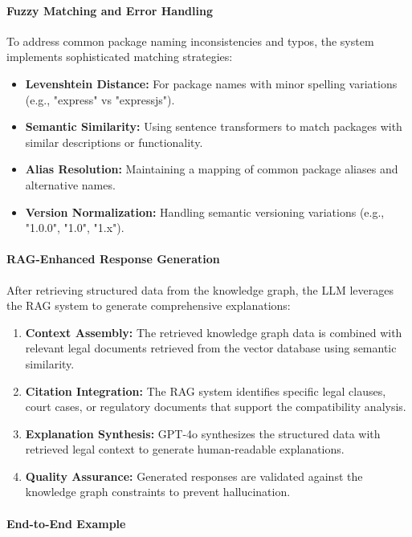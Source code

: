 \paragraph{Fuzzy Matching and Error Handling}
To address common package naming inconsistencies and typos, the system implements sophisticated matching strategies:

\begin{itemize}
    \item \textbf{Levenshtein Distance:} For package names with minor spelling variations (e.g., "express" vs "expressjs").
    \item \textbf{Semantic Similarity:} Using sentence transformers to match packages with similar descriptions or functionality.
    \item \textbf{Alias Resolution:} Maintaining a mapping of common package aliases and alternative names.
    \item \textbf{Version Normalization:} Handling semantic versioning variations (e.g., "1.0.0", "1.0", "1.x").
\end{itemize}

\paragraph{RAG-Enhanced Response Generation}
After retrieving structured data from the knowledge graph, the LLM leverages the RAG system to generate comprehensive explanations:

\begin{enumerate}
    \item \textbf{Context Assembly:} The retrieved knowledge graph data is combined with relevant legal documents retrieved from the vector database using semantic similarity.
    \item \textbf{Citation Integration:} The RAG system identifies specific legal clauses, court cases, or regulatory documents that support the compatibility analysis.
    \item \textbf{Explanation Synthesis:} GPT-4o synthesizes the structured data with retrieved legal context to generate human-readable explanations.
    \item \textbf{Quality Assurance:} Generated responses are validated against the knowledge graph constraints to prevent hallucination.
\end{enumerate}

\paragraph{End-to-End Example}

